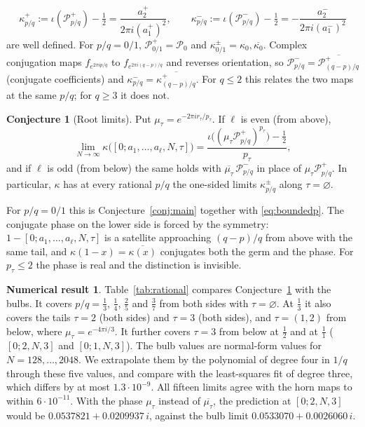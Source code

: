 \documentclass[11pt]{amsart}
\theoremstyle{definition}
\newtheorem{conjecture}[theorem]{Conjecture}
\newtheorem{observation}[theorem]{Numerical result}
\theoremstyle{remark}
\newcommand{\PP}{\mathcal{P}_0}
\newcommand{\fa}[1]{f_{e^{2\pi i#1}}}
\begin{document}
\[
\kappa^+_{p/q}:=\iota(\mathcal P^+_{p/q})-\tfrac12=\frac{a^+_2}{2\pi i(a^+_1)^2},\qquad\kappa^-_{p/q}:=\iota(\mathcal P^-_{p/q})-\tfrac12=-\frac{a^-_2}{2\pi i(a^-_1)^2}
\]
are well defined. For $p/q=0/1$, $\mathcal P^+_{0/1}=\PP$ and $\kappa^\pm_{0/1}=\kappa_0,\overline{\kappa_0}$. Complex conjugation maps $\fa{p/q}$ to $\fa{(q-p)/q}$ and reverses orientation, so $\mathcal P^-_{p/q}=\overline{\mathcal P^+_{(q-p)/q}}$ (conjugate coefficients) and $\kappa^-_{p/q}=\overline{\kappa^+_{(q-p)/q}}$. For $q\le2$ this relates the two maps at the same $p/q$; for $q\ge3$ it does not.

\begin{conjecture}[Root limits]\label{conj:rational}
Put $\mu_\tau=e^{-2\pi ir_\tau/p_\tau}$. If $\ell$ is even (from above),
\[
\lim_{N\to\infty}\kappa\bigl([0;a_1,\ldots,a_\ell,N,\tau]\bigr)=\frac{\iota\bigl((\mu_\tau\mathcal P^+_{p/q})^{p_\tau}\bigr)-\frac12}{p_\tau},
\]
and if $\ell$ is odd (from below) the same holds with $\overline{\mu_\tau}\,\mathcal P^-_{p/q}$ in place of $\mu_\tau\mathcal P^+_{p/q}$. In particular, $\kappa$ has at every rational $p/q$ the one-sided limits $\kappa^\pm_{p/q}$ along $\tau=\varnothing$.
\end{conjecture}

For $p/q=0/1$ this is Conjecture~\ref{conj:main} together with \eqref{eq:boundedp}. The conjugate phase on the lower side is forced by the symmetry: $1-[0;a_1,\ldots,a_\ell,N,\tau]$ is a satellite approaching $(q-p)/q$ from above with the same tail, and $\kappa(1-x)=\overline{\kappa(x)}$ conjugates both the germ and the phase. For $p_\tau\le2$ the phase is real and the distinction is invisible.

\begin{observation}\label{obs:rational}
Table~\ref{tab:rational} compares Conjecture~\ref{conj:rational} with the bulbs. It covers $p/q=\frac13$, $\frac14$, $\frac25$ and $\frac37$ from both sides with $\tau=\varnothing$. At $\frac13$ it also covers the tails $\tau=2$ (both sides) and $\tau=3$ (both sides), and $\tau=(1,2)$ from below, where $\mu_\tau=e^{-4\pi i/3}$. It further covers $\tau=3$ from below at $\frac12$ and at $\frac11$ ($[0;2,N,3]$ and $[0;1,N,3]$). The bulb values are normal-form values for $N=128,\ldots,2048$. We extrapolate them by the polynomial of degree four in $1/q$ through these five values, and compare with the least-squares fit of degree three, which differs by at most $1.3\cdot10^{-9}$. All fifteen limits agree with the horn maps to within $6\cdot10^{-11}$. With the phase $\mu_\tau$ instead of $\overline{\mu_\tau}$, the prediction at $[0;2,N,3]$ would be $0.0537821+0.0209937\,i$, against the bulb limit $0.0533070+0.0026060\,i$.
\end{observation}
\end{document}
